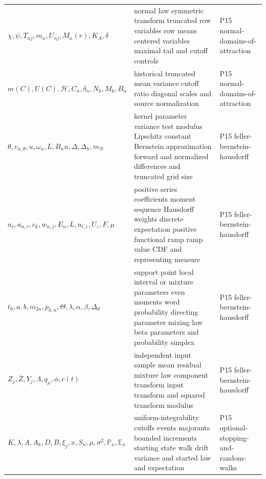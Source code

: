 \begin{longtable}{@{}p{}p{}p{}@{}}
\(\chi,\allowbreak \psi,\allowbreak T_{nj},\allowbreak m_n,\allowbreak U_{nj},\allowbreak M_n(r),\allowbreak K_A,\allowbreak \delta\) & normal law symmetric transform truncated row variables row means centered variables maximal tail and cutoff controls & P15 normal-\allowbreak{}domains-\allowbreak{}of-\allowbreak{}attraction \\
\(m(C),\allowbreak U(C),\allowbreak \mathcal H,\allowbreak C_n,\allowbreak \delta_n,\allowbreak N_k,\allowbreak M_k,\allowbreak B_n\) & historical truncated mean variance cutoff ratio diagonal scales and source normalization & P15 normal-\allowbreak{}domains-\allowbreak{}of-\allowbreak{}attraction \\
\(\theta,\allowbreak v_{n,\theta},\allowbreak u,\allowbreak \omega_u,\allowbreak L,\allowbreak B_nu,\allowbreak \Delta,\allowbreak \Delta_h,\allowbreak m_N\) & kernel parameter variance test modulus Lipschitz constant Bernstein approximation forward and normalized differences and truncated grid size & P15 feller-\allowbreak{}bernstein-\allowbreak{}hausdorff \\
\(a_r,\allowbreak a_{n,r},\allowbreak c_k,\allowbreak w_{n,j},\allowbreak E_n,\allowbreak L,\allowbreak u_{t,\varepsilon},\allowbreak U_\varepsilon,\allowbreak F,\allowbreak \mu\) & positive series coefficients moment sequence Hausdorff weights discrete expectation positive functional ramp ramp value CDF and representing measure & P15 feller-\allowbreak{}bernstein-\allowbreak{}hausdorff \\
\(t_0,\allowbreak a,\allowbreak b,\allowbreak m_{2n},\allowbreak p_{k,n},\allowbreak \Theta,\allowbreak \lambda,\allowbreak \alpha,\allowbreak \beta,\allowbreak \Delta_d\) & support point local interval or mixture parameters even moments word probability directing parameter mixing law beta parameters and probability simplex & P15 feller-\allowbreak{}bernstein-\allowbreak{}hausdorff \\
\(Z_j,\allowbreak \overline Z,\allowbreak Y_j,\allowbreak \Lambda,\allowbreak q_\mu,\allowbreak \phi,\allowbreak c(t)\) & independent input sample mean residual mixture law component transform input transform and squared transform modulus & P15 feller-\allowbreak{}bernstein-\allowbreak{}hausdorff \\
\(K,\allowbreak \lambda,\allowbreak A,\allowbreak A_k,\allowbreak D,\allowbreak B,\allowbreak \xi_j,\allowbreak x,\allowbreak S_n,\allowbreak \mu,\allowbreak \sigma^2,\allowbreak \mathbb P_x,\allowbreak \mathbb E_x\) & uniform-integrability cutoffs events majorants bounded increments starting state walk drift variance and started law and expectation & P15 optional-\allowbreak{}stopping-\allowbreak{}and-\allowbreak{}random-\allowbreak{}walks \\

\end{longtable}
